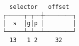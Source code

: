 \documentclass[varwidth,crop]{standalone}
\begin{document}
\begin{verbatim}
  selector   offset
┌─────┬─┬──┼────────┐
│  s  │g│p │        │
└─────┴─┴──┴────────┘
  13   1 2     32
\end{verbatim}
\end{document}
